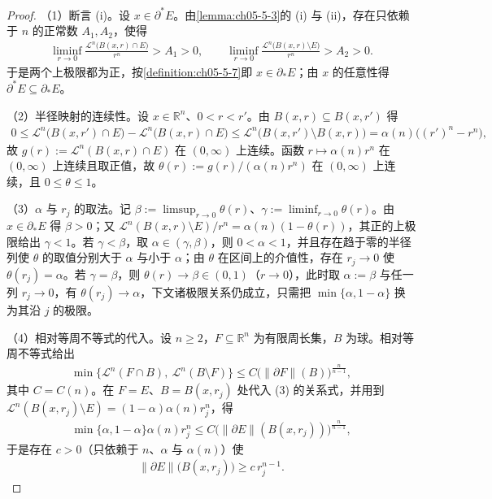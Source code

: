 \documentclass[../../main.tex]{subfiles}%
\begin{document}
\begin{proof}
（1）断言 (i)。设 $x\in\partial^*E$。由\cref{lemma:ch05-5-3}的 (i) 与 (ii)，存在只依赖于 $n$ 的正常数 $A_1,A_2$，使得%
\begin{align*}
\liminf_{r\to0}\frac{\mathcal{L}^n\bigl(B(x,r)\cap E\bigr)}{r^n}>A_1>0,\qquad
\liminf_{r\to0}\frac{\mathcal{L}^n\bigl(B(x,r)\setminus E\bigr)}{r^n}>A_2>0 .
\end{align*}
于是两个上极限都为正，按\cref{definition:ch05-5-7}即 $x\in\partial_*E$；由 $x$ 的任意性得 $\partial^*E\subseteq\partial_*E$。%

（2）半径映射的连续性。设 $x\in\mathbb{R}^n$、$0<r<r'$。由 $B(x,r)\subseteq B(x,r')$ 得
\begin{align*}
0\leqslant\mathcal{L}^n\bigl(B(x,r')\cap E\bigr)-\mathcal{L}^n\bigl(B(x,r)\cap E\bigr)\leqslant\mathcal{L}^n\bigl(B(x,r')\setminus B(x,r)\bigr)=\alpha(n)\bigl((r')^n-r^n\bigr),
\end{align*}
故 $g(r):=\mathcal{L}^n(B(x,r)\cap E)$ 在 $(0,\infty)$ 上连续。函数 $r\mapsto\alpha(n)r^n$ 在 $(0,\infty)$ 上连续且取正值，故 $\theta(r):=g(r)/(\alpha(n)r^n)$ 在 $(0,\infty)$ 上连续，且 $0\leqslant\theta\leqslant1$。

（3）$\alpha$ 与 $r_j$ 的取法。记 $\beta:=\limsup_{r\to0}\theta(r)$、$\gamma:=\liminf_{r\to0}\theta(r)$。由 $x\in\partial_*E$ 得 $\beta>0$；又 $\mathcal{L}^n(B(x,r)\setminus E)/r^n=\alpha(n)(1-\theta(r))$，其正的上极限给出 $\gamma<1$。若 $\gamma<\beta$，取 $\alpha\in(\gamma,\beta)$，则 $0<\alpha<1$，并且存在趋于零的半径列使 $\theta$ 的取值分别大于 $\alpha$ 与小于 $\alpha$；由 $\theta$ 在区间上的介值性，存在 $r_j\to0$ 使 $\theta(r_j)=\alpha$。若 $\gamma=\beta$，则 $\theta(r)\to\beta\in(0,1)$（$r\to0$），此时取 $\alpha:=\beta$ 与任一列 $r_j\to0$，有 $\theta(r_j)\to\alpha$，下文诸极限关系仍成立，只需把 $\min\{\alpha,1-\alpha\}$ 换为其沿 $j$ 的极限。

（4）相对等周不等式的代入。设 $n\geqslant2$，$F\subseteq\mathbb{R}^n$ 为有限周长集，$B$ 为球。相对等周不等式给出
\begin{align*}
\min\bigl\{\mathcal{L}^n(F\cap B),\ \mathcal{L}^n(B\setminus F)\bigr\}\leqslant C\bigl(\lVert\partial F\rVert(B)\bigr)^{\frac{n}{n-1}},
\end{align*}
其中 $C=C(n)$。在 $F=E$、$B=B(x,r_j)$ 处代入 (3) 的关系式，并用到 $\mathcal{L}^n(B(x,r_j)\setminus E)=(1-\alpha)\alpha(n)r_j^n$，得
\begin{align*}
\min\{\alpha,1-\alpha\}\alpha(n)r_j^n\leqslant C\bigl(\lVert\partial E\rVert(B(x,r_j))\bigr)^{\frac{n}{n-1}},
\end{align*}
于是存在 $c>0$（只依赖于 $n$、$\alpha$ 与 $\alpha(n)$）使
\begin{align*}
\lVert\partial E\rVert\bigl(B(x,r_j)\bigr)\geqslant c\,r_j^{n-1}.
\end{align*}


\end{proof}
\end{document}
